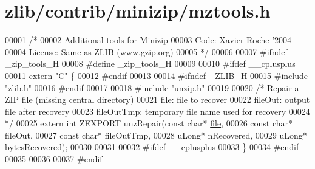 \hypertarget{zlib_2contrib_2minizip_2mztools_8h_source}{}\section{zlib/contrib/minizip/mztools.h}
\label{zlib_2contrib_2minizip_2mztools_8h_source}

\begin{DoxyCode}
00001 \textcolor{comment}{/*}
00002 \textcolor{comment}{  Additional tools for Minizip}
00003 \textcolor{comment}{  Code: Xavier Roche '2004}
00004 \textcolor{comment}{  License: Same as ZLIB (www.gzip.org)}
00005 \textcolor{comment}{*/}
00006 
00007 \textcolor{preprocessor}{#ifndef \_zip\_tools\_H}
00008 \textcolor{preprocessor}{#define \_zip\_tools\_H}
00009 
00010 \textcolor{preprocessor}{#ifdef \_\_cplusplus}
00011 \textcolor{keyword}{extern} \textcolor{stringliteral}{"C"} \{
00012 \textcolor{preprocessor}{#endif}
00013 
00014 \textcolor{preprocessor}{#ifndef \_ZLIB\_H}
00015 \textcolor{preprocessor}{#include "zlib.h"}
00016 \textcolor{preprocessor}{#endif}
00017 
00018 \textcolor{preprocessor}{#include "unzip.h"}
00019 
00020 \textcolor{comment}{/* Repair a ZIP file (missing central directory)}
00021 \textcolor{comment}{   file: file to recover}
00022 \textcolor{comment}{   fileOut: output file after recovery}
00023 \textcolor{comment}{   fileOutTmp: temporary file name used for recovery}
00024 \textcolor{comment}{*/}
00025 \textcolor{keyword}{extern} \textcolor{keywordtype}{int} ZEXPORT unzRepair(\textcolor{keyword}{const} \textcolor{keywordtype}{char}* \hyperlink{structfile}{file},
00026                              \textcolor{keyword}{const} \textcolor{keywordtype}{char}* fileOut,
00027                              \textcolor{keyword}{const} \textcolor{keywordtype}{char}* fileOutTmp,
00028                              uLong* nRecovered,
00029                              uLong* bytesRecovered);
00030 
00031 
00032 \textcolor{preprocessor}{#ifdef \_\_cplusplus}
00033 \}
00034 \textcolor{preprocessor}{#endif}
00035 
00036 
00037 \textcolor{preprocessor}{#endif}
\end{DoxyCode}
